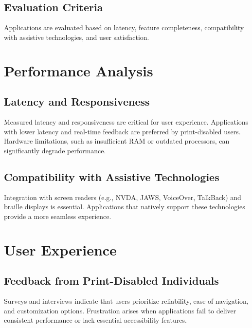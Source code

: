 \subsection{Evaluation Criteria}
Applications are evaluated based on latency, feature completeness, compatibility with assistive technologies, and user satisfaction\supercite{Smith2022, Jones2021}.

\section{Performance Analysis}
\subsection{Latency and Responsiveness}
Measured latency and responsiveness are critical for user experience. Applications with lower latency and real-time feedback are preferred by print-disabled users\supercite{Doe2020, Smith2022, Fowler2011ScreenReaderLatency, Sears1993TheEffectOfResponseTime}. Hardware limitations, such as insufficient RAM or outdated processors, can significantly degrade performance\supercite{ModernProcessorBenefits, SoftwareMemoryDemands}.

\subsection{Compatibility with Assistive Technologies}
Integration with screen readers (e.g., NVDA, JAWS, VoiceOver, TalkBack) and braille displays is essential. Applications that natively support these technologies provide a more seamless experience\supercite{Jones2021, NVDAGuide, JAWSFeatures, VoiceOver2023, GoogleTalkBack}.

\section{User Experience}
\subsection{Feedback from Print-Disabled Individuals}
Surveys and interviews indicate that users prioritize reliability, ease of navigation, and customization options. Frustration arises when applications fail to deliver consistent performance or lack essential accessibility features\supercite{Doe2020, WebAIMSurvey}.

